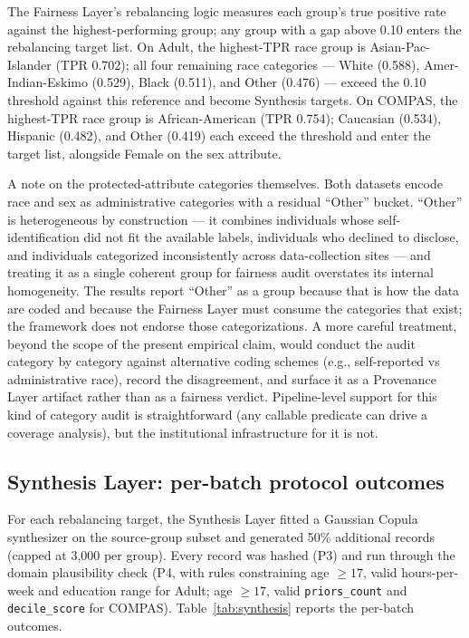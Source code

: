 \documentclass[11pt]{article}
\begin{document}
The Fairness Layer's rebalancing logic measures each group's true positive rate against the highest-performing group; any group with a gap above 0.10 enters the rebalancing target list. On Adult, the highest-TPR race group is Asian-Pac-Islander (TPR 0.702); all four remaining race categories --- White (0.588), Amer-Indian-Eskimo (0.529), Black (0.511), and Other (0.476) --- exceed the 0.10 threshold against this reference and become Synthesis targets. On COMPAS, the highest-TPR race group is African-American (TPR 0.754); Caucasian (0.534), Hispanic (0.482), and Other (0.419) each exceed the threshold and enter the target list, alongside Female on the sex attribute.

A note on the protected-attribute categories themselves. Both datasets encode race and sex as administrative categories with a residual ``Other'' bucket. ``Other'' is heterogeneous by construction --- it combines individuals whose self-identification did not fit the available labels, individuals who declined to disclose, and individuals categorized inconsistently across data-collection sites --- and treating it as a single coherent group for fairness audit overstates its internal homogeneity. The results report ``Other'' as a group because that is how the data are coded and because the Fairness Layer must consume the categories that exist; the framework does not endorse those categorizations. A more careful treatment, beyond the scope of the present empirical claim, would conduct the audit category by category against alternative coding schemes (e.g., self-reported vs administrative race), record the disagreement, and surface it as a Provenance Layer artifact rather than as a fairness verdict. Pipeline-level support for this kind of category audit is straightforward (any callable predicate can drive a coverage analysis), but the institutional infrastructure for it is not.

\subsection{Synthesis Layer: per-batch protocol outcomes}

For each rebalancing target, the Synthesis Layer fitted a Gaussian Copula synthesizer on the source-group subset and generated 50\% additional records (capped at 3,000 per group). Every record was hashed (P3) and run through the domain plausibility check (P4, with rules constraining age $\geq 17$, valid hours-per-week and education range for Adult; age $\geq 17$, valid \texttt{priors\_count} and \texttt{decile\_score} for COMPAS). Table~\ref{tab:synthesis} reports the per-batch outcomes.
\end{document}
